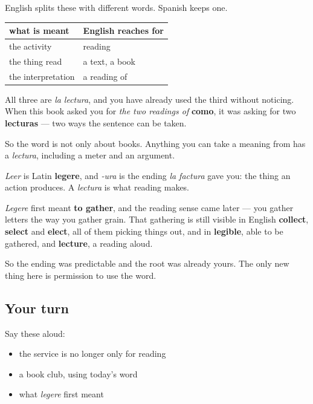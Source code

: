 \begin{grammarlens}[title={Grammar Lens: three things one word covers}]
English splits these with different words. Spanish keeps one.

\noindent
\begin{tabularx}{\linewidth}{@{}>{\raggedright\arraybackslash}X>{\raggedright\arraybackslash}X@{}}
\toprule
\textbf{what is meant} & \textbf{English reaches for} \\
\midrule
the activity & reading \\
the thing read & a text, a book \\
the interpretation & a reading of \\
\bottomrule
\end{tabularx}

All three are \emph{la lectura}, and you have already used the third without noticing. When this book asked you for \emph{the two readings of} \textbf{como}, it was asking for two \textbf{lecturas} — two ways the sentence can be taken.

So the word is not only about books. Anything you can take a meaning from has a \emph{lectura}, including a meter and an argument.
\end{grammarlens}

\begin{cousinweb}
\emph{Leer} is Latin \textbf{legere}, and \emph{-ura} is the ending \emph{la factura} gave you: the thing an action produces. A \emph{lectura} is what reading makes.

\emph{Legere} first meant \textbf{to gather}, and the reading sense came later — you gather letters the way you gather grain. That gathering is still visible in English \textbf{collect}, \textbf{select} and \textbf{elect}, all of them picking things out, and in \textbf{legible}, able to be gathered, and \textbf{lecture}, a reading aloud.

So the ending was predictable and the root was already yours. The only new thing here is permission to use the word.
\end{cousinweb}

\subsection*{Your turn}
Say these aloud:

\begin{itemize}
\raggedright
  \item the service is no longer only for reading
  \item a book club, using today's word
  \item what \emph{legere} first meant
\end{itemize}

